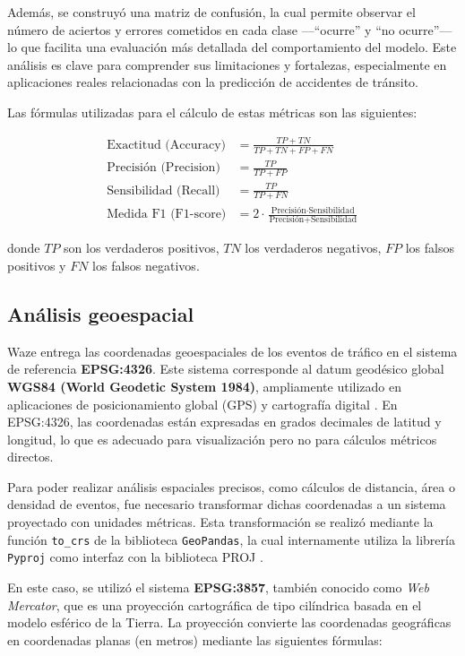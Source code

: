 \documentclass[12pt]{article}
\begin{document}
Además, se construyó una matriz de confusión, la cual permite observar el número de aciertos y errores cometidos en cada clase —“ocurre” y “no ocurre”— lo que facilita una evaluación más detallada del comportamiento del modelo. Este análisis es clave para comprender sus limitaciones y fortalezas, especialmente en aplicaciones reales relacionadas con la predicción de accidentes de tránsito.

Las fórmulas utilizadas para el cálculo de estas métricas son las siguientes:

\[
\begin{aligned}
\text{Exactitud (Accuracy)} &= \frac{TP + TN}{TP + TN + FP + FN} \\
\text{Precisión (Precision)} &= \frac{TP}{TP + FP} \\
\text{Sensibilidad (Recall)} &= \frac{TP}{TP + FN} \\
\text{Medida F1 (F1-score)} &= 2 \cdot \frac{\text{Precisión} \cdot \text{Sensibilidad}}{\text{Precisión} + \text{Sensibilidad}}
\end{aligned}
\]

donde \( TP \) son los verdaderos positivos, \( TN \) los verdaderos negativos, \( FP \) los falsos positivos y \( FN \) los falsos negativos.


\subsection{Análisis geoespacial}


Waze entrega las coordenadas geoespaciales de los eventos de tráfico en el sistema de referencia \textbf{EPSG:4326}. Este sistema corresponde al datum geodésico global \textbf{WGS84 (World Geodetic System 1984)}, ampliamente utilizado en aplicaciones de posicionamiento global (GPS) y cartografía digital \citep{epsg4326}. En EPSG:4326, las coordenadas están expresadas en grados decimales de latitud y longitud, lo que es adecuado para visualización pero no para cálculos métricos directos.

Para poder realizar análisis espaciales precisos, como cálculos de distancia, área o densidad de eventos, fue necesario transformar dichas coordenadas a un sistema proyectado con unidades métricas. Esta transformación se realizó mediante la función \texttt{to\_crs} de la biblioteca \texttt{GeoPandas}, la cual internamente utiliza la librería \texttt{Pyproj} como interfaz con la biblioteca PROJ \citep{gdal_proj, pyproj, geopandas}.

En este caso, se utilizó el sistema \textbf{EPSG:3857}, también conocido como \emph{Web Mercator}, que es una proyección cartográfica de tipo cilíndrica basada en el modelo esférico de la Tierra. La proyección convierte las coordenadas geográficas en coordenadas planas (en metros) mediante las siguientes fórmulas:
\end{document}
